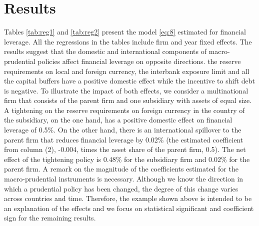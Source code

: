 \documentclass[12pt]{article}
\begin{document}
	\section{Results} \label{sec:result}
	 Tables \ref{tab:reg1} and \ref{tab:reg2} present the model \ref{eq:8} estimated for financial leverage. All the regressions in the tables include firm and year fixed effects. The results suggest that the domestic and international components of macro-prudential policies affect financial leverage on opposite directions. the reserve requirements on local and foreign currency, the interbank exposure limit and all the capital buffers have a positive domestic effect while the incentive to shift debt is negative. To illustrate the impact of both effects, we consider a multinational firm that consists of the parent firm and one subsidiary with assets of equal size. A tightening on the reserve requirements on foreign currency in the country of the subsidiary, on the one hand, has a positive domestic effect on financial leverage of 0.5\%. On the other hand, there is an international spillover to the parent firm that reduces financial leverage by 0.02\% (the estimated coefficient from column (2), -0.004, times the  asset share of the parent firm, 0.5). The net effect of the tightening policy is 0.48\% for the subsidiary firm and 0.02\% for the parent firm. A remark on the magnitude of the coefficients estimated for the macro-prudential instruments is necessary. Although we know the direction in which a prudential policy has been changed, the degree of this change varies across countries and time. Therefore, the example shown above is intended to be an explanation of the effects and we focus on statistical significant and coefficient sign for the remaining results. 
	 
\end{document}
